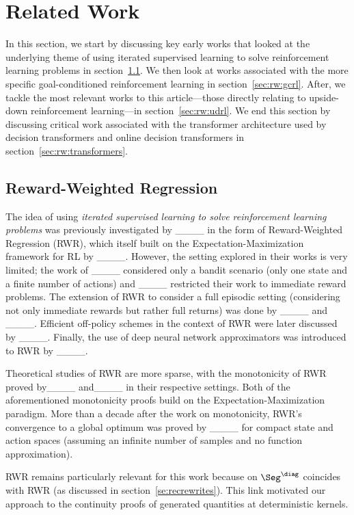 \section{Related Work}
\label{se:relwork}




In this section, we start by discussing key early works that looked at the underlying theme of using iterated supervised learning to solve reinforcement learning problems in section~\ref{sec:rw:rwr}.
We then look at works associated with the more specific goal-conditioned reinforcement learning in section~\ref{sec:rw:gcrl}.
After, we tackle the most relevant works to this article---those directly relating to upside-down reinforcement learning---in section~\ref{sec:rw:udrl}.
We end this section by discussing critical work associated with the transformer architecture used by decision transformers and online decision transformers in section~\ref{sec:rw:transformers}.


\subsection{Reward-Weighted Regression}
\label{sec:rw:rwr}

The idea of using \emph{iterated supervised learning to solve reinforcement learning problems} was previously investigated by ____ in the form of Reward-Weighted Regression (RWR),
which itself built on the Expectation-Maximization framework for RL by ____.
However, the setting explored in their works is very limited; the work of ____ considered only a bandit scenario
(only one state and a finite number of actions) and
____ restricted their work to immediate reward
problems.
The extension of RWR to consider a full episodic setting (considering not only immediate rewards but rather full returns) was done by ____
and ____.
Efficient off-policy schemes in the context of RWR were later discussed by ____.
Finally, the use of deep neural network approximators was introduced to RWR by ____.

Theoretical studies of RWR are more sparse, with the monotonicity of RWR proved by____ and____ in their respective settings. Both of the aforementioned monotonicity proofs build on the Expectation-Maximization paradigm.
More than a decade after the work on monotonicity, RWR's convergence to a global optimum was
proved by ____ for compact state and action spaces (assuming an infinite number of samples and no function approximation).

RWR remains particularly relevant for this work because \eUDRL{} on $\Seg^{\diag}$
coincides with RWR (as discussed in section~\ref{se:recrewrites}).
This link motivated our approach to the continuity proofs
of \eUDRL{} generated quantities at deterministic kernels.


